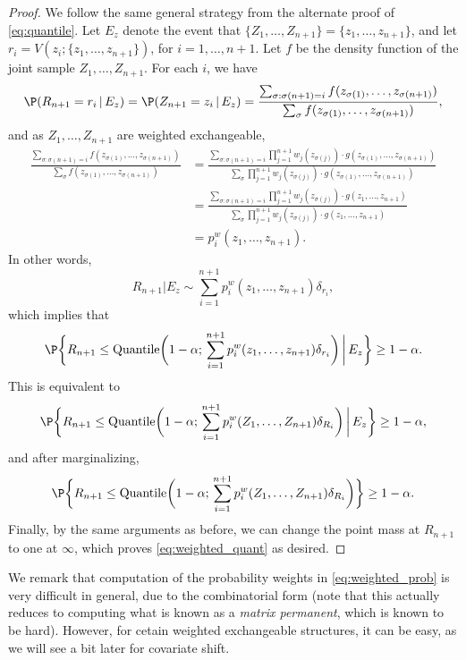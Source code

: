 \documentclass{article}
\begin{document}
\begin{proof}
We follow the same general strategy from the alternate proof of
\eqref{eq:quantile}. Let $E_z$ denote the event that
$\{Z_1,\dots,Z_{n+1}\}=\{z_1,\dots,z_{n+1}\}$, and let $r_i=V(z_i;
\{z_1,\dots,z_{n+1}\})$, for $i=1,\dots,n+1$. Let $f$ be the density function
of the joint sample $Z_1,\dots,Z_{n+1}$. For each $i$, we have
\begin{equation}
\label{eq:general_calc}
\P(R_{n+1} = r_i \,|\, E_z) = \P(Z_{n+1} = z_i \,|\, E_z)
= \frac{\sum_{\sigma : \sigma(n+1)=i} f(z_{\sigma(1)},\dots, z_{\sigma(n+1)})} 
{\sum_\sigma f(z_{\sigma(1)},\dots, z_{\sigma(n+1)})},
\end{equation}
and as $Z_1,\dots,Z_{n+1}$ are weighted exchangeable,
\begin{align*}
\frac{\sum_{\sigma : \sigma(n+1)=i} f(z_{\sigma(1)},\dots, z_{\sigma(n+1)})}  
{\sum_\sigma f(z_{\sigma(1)},\dots, z_{\sigma(n+1)})} &= 
\frac{\sum_{\sigma : \sigma(n+1)=i} \prod_{j=1}^{n+1} w_j(z_{\sigma(j)}) \cdot 
  g(z_{\sigma(1)},\dots,z_{\sigma(n+1)})}
{\sum_\sigma \prod_{j=1}^{n+1} w_j(z_{\sigma(j)}) \cdot
  g(z_{\sigma(1)},\dots,z_{\sigma(n+1)})}  \\
&= \frac{\sum_{\sigma : \sigma(n+1)=i} \prod_{j=1}^{n+1} w_j(z_{\sigma(j)})
  \cdot g(z_1,\dots,z_{n+1})} 
{\sum_\sigma\prod_{j=1}^{n+1} w_j(z_{\sigma(j)}) \cdot g(z_1,\dots,z_{n+1})} \\ 
&= p^w_i(z_1,\dots,z_{n+1}).
\end{align*}
In other words,  
\begin{equation}
\label{eq:weighted_dist}
R_{n+1}|E_z \sim \sum_{i=1}^{n+1} p^w_i(z_1,\dots,z_{n+1})\delta_{r_i},
\end{equation}
which implies that
\[
\P\bigg\{ R_{n+1} \leq \Quantile\bigg( 1-\alpha; \, \sum_{i=1}^{n+1}
p^w_i(z_1,\dots,z_{n+1})\delta_{r_i}\bigg) \, \bigg| \, E_z\bigg\} \geq
1-\alpha.  
\]
This is equivalent to  
\[
\P\bigg\{ R_{n+1} \leq \Quantile\bigg( 1-\alpha; \, \sum_{i=1}^{n+1} 
p^w_i(Z_1,\dots,Z_{n+1}) \delta_{R_i}\bigg) \, \bigg| \, E_z\bigg\} \geq
1-\alpha,  
\]
and after marginalizing, 
\[
\P\bigg\{ R_{n+1} \leq \Quantile\bigg( 1-\alpha; \, \sum_{i=1}^{n+1} 
p^w_i(Z_1,\dots,Z_{n+1}) \delta_{R_i}\bigg) \bigg\} \geq 1-\alpha. 
\]
Finally, by the same arguments as before, we can change the point mass at 
$R_{n+1}$ to one at $\infty$, which proves \eqref{eq:weighted_quant} as
desired. 
\end{proof}

We remark that computation of the probability weights in
\eqref{eq:weighted_prob} is very difficult in general, due to the combinatorial  
form (note that this actually reduces to computing what is known as a
\emph{matrix permanent}, which is known to be hard). However, for cetain
weighted exchangeable structures, it can be easy, as we will see a bit later for
covariate shift. 
\end{document}
